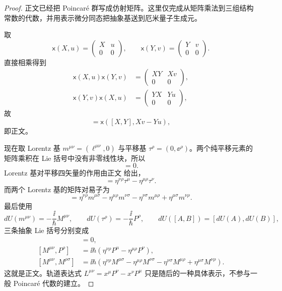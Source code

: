 \begin{proof}
正文已经把 Poincar\'e 群写成仿射矩阵。这里仅完成从矩阵乘法到三组结构常数的代数，并用表示微分同态把抽象基送到厄米量子生成元。

取
\begin{equation*}
 \mathsf x(X,u)=
 \begin{pmatrix}X&u\\0&0\end{pmatrix},
 \qquad
 \mathsf x(Y,v)=
 \begin{pmatrix}Y&v\\0&0\end{pmatrix}.
\end{equation*}
直接相乘得到
\begin{align*}
 \mathsf x(X,u)\mathsf x(Y,v)
 &=\begin{pmatrix}XY&Xv\\0&0\end{pmatrix},\\
 \mathsf x(Y,v)\mathsf x(X,u)
 &=\begin{pmatrix}YX&Yu\\0&0\end{pmatrix},
\end{align*}
故
\begin{equation*}
 [\mathsf x(X,u),\mathsf x(Y,v)]
 =\mathsf x([X,Y],Xv-Yu),
\end{equation*}
即正文。

现在取 Lorentz 基 $m^{\mu\nu}=(\ell^{\mu\nu},0)$ 与平移基 $\tau^\rho=(0,\ee^\rho)$。两个纯平移元素的矩阵乘积在 Lie 括号中没有非零线性块，所以
\begin{equation*}
 [\tau^\mu,\tau^\nu]=0.
\end{equation*}
Lorentz 基对平移四矢量的作用由正文 给出，
\begin{equation*}
 [m^{\mu\nu},\tau^\rho]
 =\eta^{\nu\rho}\tau^\mu-\eta^{\mu\rho}\tau^\nu.
\end{equation*}
而两个 Lorentz 基的矩阵对易子为
\begin{equation*}
[m^{\mu\nu},m^{\rho\sigma}]
=\eta^{\nu\rho}m^{\mu\sigma}
-\eta^{\mu\rho}m^{\nu\sigma}
-\eta^{\nu\sigma}m^{\mu\rho}
+\eta^{\mu\sigma}m^{\nu\rho}.
\end{equation*}
最后使用
\begin{equation*}
 dU(m^{\mu\nu})=-\frac{\ii}{\hbar}M^{\mu\nu},
 \qquad
 dU(\tau^\rho)=-\frac{\ii}{\hbar}P^\rho,
 \qquad
 dU([A,B])=[dU(A),dU(B)],
\end{equation*}
三条抽象 Lie 括号分别变成
\begin{align*}
 [P^\mu,P^\nu]&=0,\\
 [M^{\mu\nu},P^\rho]
 &=\ii\hbar(\eta^{\nu\rho}P^\mu-\eta^{\mu\rho}P^\nu),\\
 [M^{\mu\nu},M^{\rho\sigma}]
 &=\ii\hbar\left(
 \eta^{\nu\rho}M^{\mu\sigma}
 -\eta^{\mu\rho}M^{\nu\sigma}
 -\eta^{\nu\sigma}M^{\mu\rho}
 +\eta^{\mu\sigma}M^{\nu\rho}\right).
\end{align*}
这就是正文。轨道表达式 $L^{\mu\nu}=x^\mu P^\nu-x^\nu P^\mu$ 只是随后的一种具体表示，不参与一般 Poincar\'e 代数的建立。
\end{proof}

